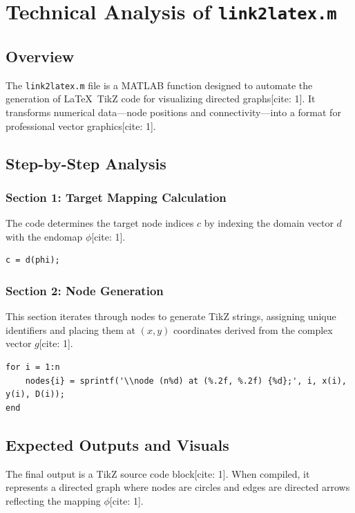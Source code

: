 
\chapter{Technical Analysis of \texttt{link2latex.m}}
\date{March 10, 2026}

\maketitle

\section{Overview}
The \texttt{link2latex.m} file is a MATLAB function designed to automate the generation of \LaTeX\ TikZ code for visualizing directed graphs[cite: 1]. It transforms numerical data—node positions and connectivity—into a format for professional vector graphics[cite: 1].

\section{Step-by-Step Analysis}

\subsection{Section 1: Target Mapping Calculation}
The code determines the target node indices $c$ by indexing the domain vector $d$ with the endomap $\phi$[cite: 1].
\begin{lstlisting}
c = d(phi);
\end{lstlisting}

\subsection{Section 2: Node Generation}
This section iterates through nodes to generate TikZ strings, assigning unique identifiers and placing them at $(x, y)$ coordinates derived from the complex vector $g$[cite: 1].
\begin{lstlisting}
for i = 1:n
    nodes{i} = sprintf('\\node (n%d) at (%.2f, %.2f) {%d};', i, x(i), y(i), D(i));
end
\end{lstlisting}

\section{Expected Outputs and Visuals}
The final output is a TikZ source code block[cite: 1]. When compiled, it represents a directed graph where nodes are circles and edges are directed arrows reflecting the mapping $\phi$[cite: 1].
